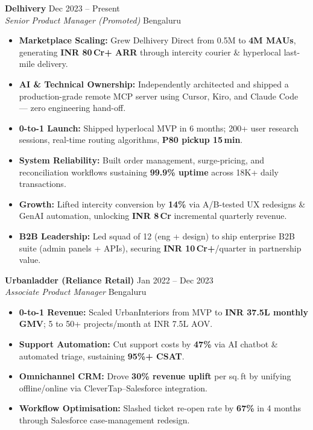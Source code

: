 \documentclass[a4paper,10pt]{article}
\newcommand{\roleheader}[4]{%
  \vspace{3pt}%
  \noindent\textbf{\color{darktext}\large #1}%
  \hfill{\footnotesize\color{lighttext}#4}\\[-1pt]%
  {\color{accent}\textit{#2}}%
  \hfill{\footnotesize\color{lighttext}#3}%
  \vspace{1pt}%
}
\newcommand{\metric}[1]{\textcolor{accent}{\textbf{#1}}}
\begin{document}
\roleheader{Delhivery}{Senior Product Manager \textnormal{\small(Promoted)}}{Bengaluru}{Dec 2023 -- Present}
\begin{itemize}
  \item \textbf{Marketplace Scaling:} Grew Delhivery Direct from 0.5M to \metric{4M MAUs}, generating \metric{INR 80\,Cr+ ARR} through intercity courier \& hyperlocal last-mile delivery.
  \item \textbf{AI \& Technical Ownership:} Independently architected and shipped a production-grade remote MCP server using Cursor, Kiro, and Claude Code — zero engineering hand-off.
  \item \textbf{0-to-1 Launch:} Shipped hyperlocal MVP in 6 months; 200+ user research sessions, real-time routing algorithms, \metric{P80 pickup 15\,min}.
  \item \textbf{System Reliability:} Built order management, surge-pricing, and reconciliation workflows sustaining \metric{99.9\% uptime} across 18K+ daily transactions.
  \item \textbf{Growth:} Lifted intercity conversion by \metric{14\%} via A/B-tested UX redesigns \& GenAI automation, unlocking \metric{INR 8\,Cr} incremental quarterly revenue.
  \item \textbf{B2B Leadership:} Led squad of 12 (eng + design) to ship enterprise B2B suite (admin panels + APIs), securing \metric{INR 10\,Cr+}/quarter in partnership value.
\end{itemize}

\roleheader{Urbanladder \textnormal{\small(Reliance Retail)}}{Associate Product Manager}{Bengaluru}{Jan 2022 -- Dec 2023}
\begin{itemize}
  \item \textbf{0-to-1 Revenue:} Scaled UrbanInteriors from MVP to \metric{INR 37.5L monthly GMV}; 5 to 50+ projects/month at INR 7.5L AOV.
  \item \textbf{Support Automation:} Cut support costs by \metric{47\%} via AI chatbot \& automated triage, sustaining \metric{95\%+ CSAT}.
  \item \textbf{Omnichannel CRM:} Drove \metric{30\% revenue uplift} per sq.\,ft by unifying offline/online via CleverTap--Salesforce integration.
  \item \textbf{Workflow Optimisation:} Slashed ticket re-open rate by \metric{67\%} in 4 months through Salesforce case-management redesign.
\end{itemize}
\end{document}
